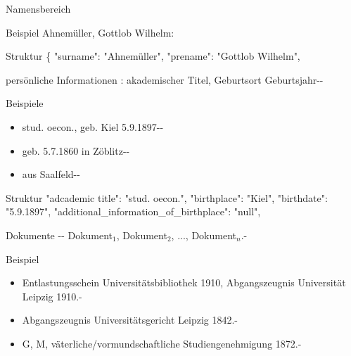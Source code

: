 \documentclass[12pt]{beamer}
\begin{document}
\begin{large}
\begin{frame}{Namensbereich}
 \vspace*{\fill}
 \begin{block}{Beispiel}
 \normalsize Ahnemüller, Gottlob Wilhelm:
 \end{block}

 \begin{block}{Struktur}
  \normalsize
  \{
  \newline
  \hspace*{0.5cm}
  "{}surname"{}: "{}Ahnemüller"{},
  \newline
  \hspace*{0.5cm}    
  "{}prename"{}: "{}Gottlob Wilhelm"{},
 \end{block} 
\end{frame}


\begin{frame}{persönliche Informationen}
 : akademischer Titel, Geburtsort Geburtsjahr-{}-

 \vspace*{\fill}
 \begin{block}{Beispiele}
  \normalsize
  \begin{itemize}
   \item stud. oecon., geb. Kiel 5.9.1897-{}-
   \item geb. 5.7.1860 in  Zöblitz-{}-
   \item aus Saalfeld-{}-
  \end{itemize}
 \end{block}
 
 \begin{block}{Struktur}
  \normalsize
  \hspace*{0.5cm}
  "{}adcademic title"{}: "{}stud. oecon."{},
  \newline 
  \hspace*{0.5cm}    
  "{}birthplace"{}: "{}Kiel"{},
  \newline
  \hspace*{0.5cm}
  "{}birthdate"{}: "{}5.9.1897"{},    
  \newline
  \hspace*{0.5cm}
  "{}additional\_information\_of\_birthplace"{}: "{}null"{},
 \end{block} 
\end{frame}

\begin{frame}{Dokumente}
 -{}- Dokument$_1$, Dokument$_2$, ..., Dokument$_n$.-

 \vspace*{\fill}
 \begin{block}{Beispiel}
  \normalsize
  \begin{itemize}
   \item Entlastungsschein Universitätsbibliothek 1910, Abgangszeugnis Universität Leipzig 1910.-
   \item Abgangszeugnis Universitätsgericht Leipzig 1842.-
   \item G, M, väterliche/vormundschaftliche Studiengenehmigung 1872.-
  \end{itemize}
 \end{block}
 

\end{frame}
\end{large}
\end{document}

